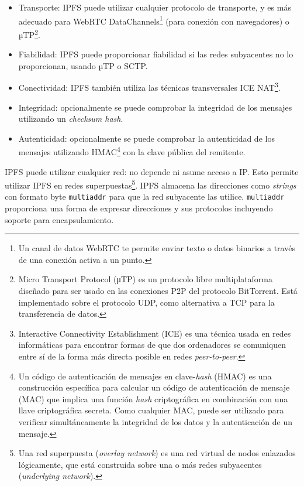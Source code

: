 \documentclass[12pt]{article} %
\begin{document}
\begin{itemize}
	\item Transporte: IPFS puede utilizar cualquier protocolo de transporte, y es más adecuado para WebRTC DataChannels\footnote{Un canal de datos WebRTC te permite enviar texto o datos binarios a través de una conexión activa a un punto.\cite{WebRTC-data-channels}} (para conexión con navegadores) o µTP\footnote{Micro Transport Protocol (μTP) es un protocolo libre multiplataforma diseñado para ser usado en las conexiones P2P del protocolo BitTorrent. Está implementado sobre el protocolo UDP, como alternativa a TCP para la transferencia de datos.\cite{micro-transport-protocol}}.
	\item Fiabilidad: IPFS puede proporcionar fiabilidad si las redes subyacentes no lo proporcionan, usando µTP o SCTP.
	\item Conectividad: IPFS también utiliza las técnicas transversales ICE NAT\footnote{Interactive Connectivity Establishment (ICE) es una técnica usada en redes informáticas para encontrar formas de que dos ordenadores se comuniquen entre sí de la forma más directa posible en redes \textit{peer-to-peer}.\cite{interactive-connectivity-establishment}}.
	\item Integridad: opcionalmente se puede comprobar la integridad de los mensajes utilizando un \textit{checksum hash}.
	\item Autenticidad: opcionalmente se puede comprobar la autenticidad de los mensajes utilizando HMAC\footnote{Un código de autenticación de mensajes en clave-\textit{hash} (HMAC) es una construcción específica para calcular un código de autenticación de mensaje (MAC) que implica una función \textit{hash} criptográfica en combinación con una llave criptográfica secreta. Como cualquier MAC, puede ser utilizado para verificar simultáneamente la integridad de los datos y la autenticación de un mensaje.\cite{HMAC}} con la clave pública del remitente.
\end{itemize}

IPFS puede utilizar cualquier red: no depende ni asume acceso a IP. Esto permite utilizar IPFS en redes superpuestas\footnote{Una red superpuesta (\textit{overlay network}) es una red virtual de nodos enlazados lógicamente, que está construida sobre una o más redes subyacentes (\textit{underlying network}).\cite{red-superpuesta}}. IPFS almacena las direcciones como \textit{strings} con formato byte \texttt{multiaddr} para que la red subyacente las utilice. \texttt{multiaddr} proporciona una forma de expresar direcciones y sus protocolos incluyendo soporte para encapsulamiento.
\end{document}
